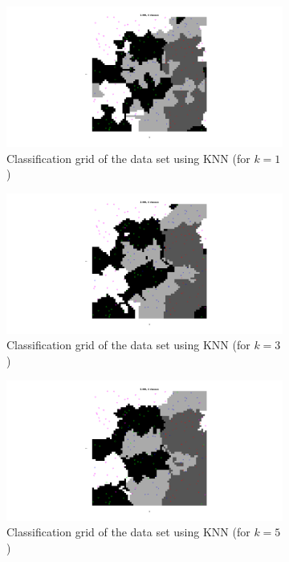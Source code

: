 \documentclass[10pt]{article}
\begin{document}
\begin{figure}[H]
  \centering
  \begin{subfigure}{.48\textwidth}
    \includegraphics[width=.8\linewidth]{assign2_4_1.png}
    \caption{Classification grid of the data set using KNN (for $k=1$)}
    \label{fig2.4a}
  \end{subfigure}
  \begin{subfigure}{.48\textwidth}
    \includegraphics[width=.8\linewidth]{assign2_4_3.png}
    \caption{Classification grid of the data set using KNN (for $k=3$)}
    \label{fig2.4b}
  \end{subfigure}
  \begin{subfigure}{.48\textwidth}
    \includegraphics[width=.8\textwidth]{assign2_4_5.png}
    \caption{Classification grid of the data set using KNN (for $k=5$)}
    \label{fig2.4c}
  \end{subfigure}
  \begin{subfigure}{.48\textwidth}

\end{subfigure}
\end{figure}
\end{document}
